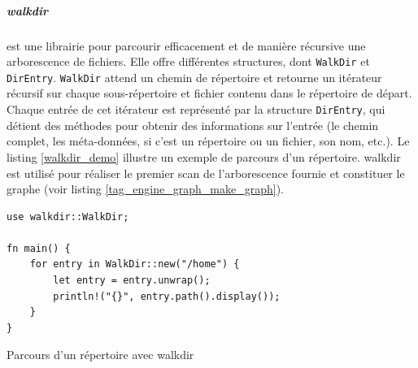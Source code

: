\subparagraph{walkdir}
est une librairie pour parcourir efficacement et de manière récursive une arborescence de fichiers.
Elle offre différentes structures, dont \texttt{WalkDir} et \texttt{DirEntry}. 
\texttt{WalkDir} attend un chemin de répertoire et retourne un itérateur récursif sur 
chaque sous-répertoire et fichier contenu dans le répertoire de départ. Chaque entrée de cet 
itérateur est représenté par la structure \texttt{DirEntry}, qui détient des méthodes 
pour obtenir des informations sur l'entrée (le chemin complet, les méta-données, si c'est un 
répertoire ou un fichier, son nom, etc.). Le listing \ref{walkdir_demo} illustre un exemple de 
parcours d'un répertoire. walkdir est utilisé pour réaliser le premier scan de l'arborescence 
fournie et constituer le graphe (voir listing \ref{tag_engine_graph_make_graph}).
\bigbreak
\begin{code}
    \begin{verbatim}
use walkdir::WalkDir;

fn main() {
    for entry in WalkDir::new("/home") {
        let entry = entry.unwrap();
        println!("{}", entry.path().display());
    }
}
    \end{verbatim}
    \caption{Parcours d'un répertoire avec walkdir}
    \label{walkdir_demo}
\end{code}


